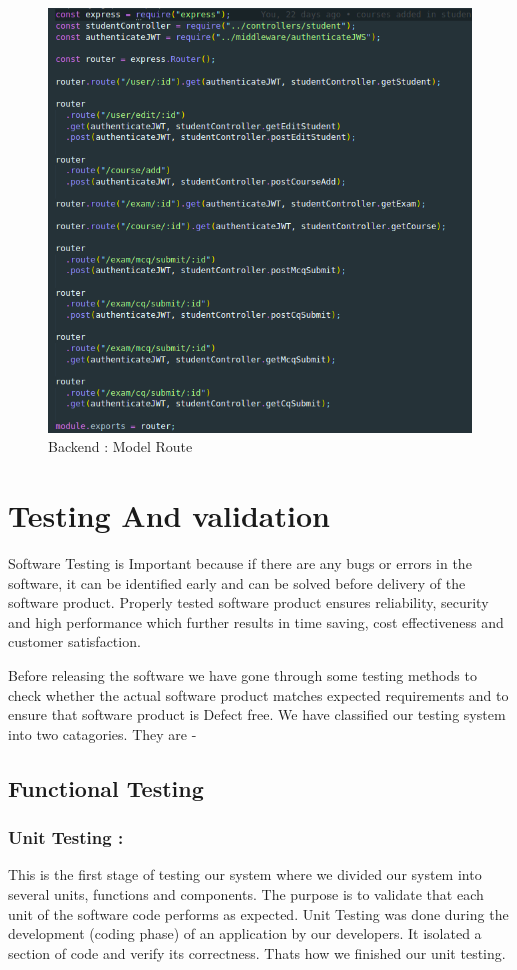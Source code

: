 \documentclass[10pt]{article}
\begin{document}
\begin{figure}[H]
  \centering
  \centerline{\includegraphics[width=.6\textwidth]{routes.png}}
  \caption{Backend : Model Route}
  \label{fig}
\end{figure}


\section{Testing And validation}

Software Testing is Important because if there are any bugs or errors in the software, it can be identified early and can be solved before delivery of the software product. Properly tested software product ensures reliability, security and high performance which further results in time saving, cost effectiveness and customer satisfaction.

Before releasing the software we have gone through some testing methods to check whether the actual software product matches expected requirements and to ensure that software product is Defect free.
We have classified our testing system into two catagories. They are -
\subsection{Functional Testing}


\subsubsection{Unit Testing : } This is the first stage of testing our system where we divided our  system into several units, functions and components. The purpose is to validate that each unit of the software code performs as expected. Unit Testing was done during the development (coding phase) of an application by our developers. It isolated a section of code and verify its correctness. Thats how we finished our unit testing.
\end{document}
